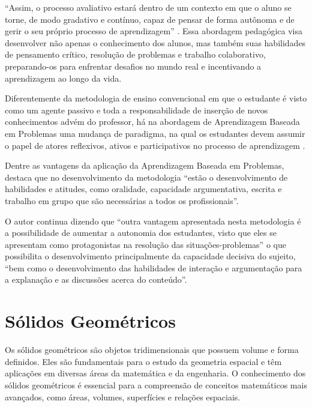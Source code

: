 ``Assim, o processo avaliativo estará dentro de um contexto em que o aluno se torne, de modo gradativo e contínuo, capaz de pensar de forma autônoma e de gerir o seu próprio processo de aprendizagem'' \cite[p. 121]{CAMARGO2019}. Essa abordagem pedagógica visa desenvolver não apenas o conhecimento dos alunos, mas também suas habilidades de pensamento crítico, resolução de problemas e trabalho colaborativo, preparando-os para enfrentar desafios no mundo real e incentivando a aprendizagem ao longo da vida.

\begin{citacao}
    Diferentemente da metodologia de ensino convencional em que o estudante é visto como um agente passivo e toda a responsabilidade de inserção de novos conhecimentos advém do professor, há na abordagem de Aprendizagem Baseada em Problemas uma mudança de paradigma, na qual os estudantes devem assumir o papel de atores reflexivos, ativos e participativos no processo de aprendizagem \cite[p. 45]{NUNES2022}.
\end{citacao}

Dentre as vantagens da aplicação da Aprendizagem Baseada em Problemas,  destaca que no desenvolvimento da metodologia ``estão o desenvolvimento de habilidades e atitudes, como oralidade, capacidade argumentativa, escrita e trabalho em grupo que são necessárias a todos os profissionais''.

O autor continua dizendo que ``outra vantagem apresentada nesta metodologia é a possibilidade de aumentar a autonomia dos estudantes, visto que eles se apresentam como protagonistas na resolução das situações-problemas'' o que possibilita o desenvolvimento principalmente da capacidade decisiva do sujeito, ``bem como o desenvolvimento das habilidades de interação e argumentação para a explanação e as discussões acerca do conteúdo''.

\section{Sólidos Geométricos}


Os sólidos geométricos são objetos tridimensionais que possuem volume e forma definidos. Eles são fundamentais para o estudo da geometria espacial e têm aplicações em diversas áreas da matemática e da engenharia. O conhecimento dos sólidos geométricos é essencial para a compreensão de conceitos matemáticos mais avançados, como áreas, volumes, superfícies e relações espaciais.

